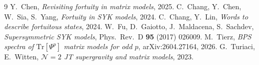 \documentclass[10pt]{article}
\begin{document}
\begin{thebibliography}{9}\small
{} Y.~Chen, \emph{Revisiting fortuity in matrix models}, 2025.
 C.~Chang, Y.~Chen, W.~Sia, S.~Yang, \emph{Fortuity in SYK models}, 2024.
 C.~Chang, Y.~Lin, \emph{Words to describe fortuitous states}, 2024.
 W.~Fu, D.~Gaiotto, J.~Maldacena, S.~Sachdev, \emph{Supersymmetric SYK models},
Phys.\ Rev.\ D \textbf{95} (2017) 026009.
 M.~Tierz, \emph{BPS spectra of $\mathrm{Tr}[\Psi^p]$ matrix models for odd $p$},
arXiv:2604.27164, 2026.
 G.~Turiaci, E.~Witten, \emph{$\mathcal N=2$ JT supergravity and matrix models}, 2023.
\end{thebibliography}
\end{document}
